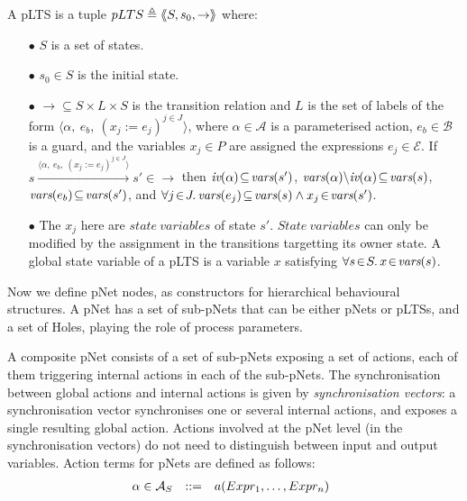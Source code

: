 \documentclass{lncs/llncs}
\def\AlgE{\mathcal{E}}
\def\AlgA{\mathcal{A}}
\def\AlgAS{\mathcal{A}_S}
\def\AlgB{\mathcal{B}}
\begin{document}
\begin{definition}[pLTS]
\label{pLTS}
A pLTS is a tuple
$pLTS\triangleq\langle\hspace{-0.58ex}\langle S,s_0, \to\rangle\hspace{-0.58ex}\rangle$ where:
\begin{itemize}
\item[$\bullet$]
$S$ is a set of states.
\item[$\bullet$]
$s_0 \in S$ is the initial state.
\item[$\bullet$] $\to \subseteq S \times L \times S$ is the transition relation and 
$L$ is the set of labels of the form
$\langle \alpha,~e_b,~(x_j\!:= {e}_j)^{j\in J}\rangle$,
where $\alpha \in\AlgA$ is a parameterised action, $e_b \in
\AlgB$ is a guard, and the variables $x_j\in P$
are assigned the expressions $e_j\in \AlgE$.
If 
$s \xrightarrow{\langle \alpha,~e_b,~(x_j\!:= {e}_j)^{j\in
		J}\rangle} s'\in \to $ then $\iv(\alpha)\!\subseteq\! \vars(s')$, 
		$\vars(\alpha)\backslash \iv(\alpha)\!\subseteq\! \vars(s)$, 
		$\vars(e_b)\!\subseteq\! \vars(s')$, and
		$\forall j\!\in\! J .\,\vars(e_j)\!\subseteq\! \vars(s)\land 
		x_j\!\in\!\vars(s')$. %
\item[$\bullet$]
The $x_j$ here are $state\ variables$ of state $s'$. $State\ variables$ can only be modified by the assignment in the transitions targetting its owner state. A global state variable of a pLTS is a variable $x$ satisfying $\forall s\!\in\! S .\, x\!\in\! \vars(s)$.


\end{itemize}
\end{definition}

Now we define
pNet nodes, as constructors for hierarchical behavioural structures.
A pNet has a set of sub-pNets that can be either pNets or pLTSs, and a
set of Holes, playing the role of process parameters.

A composite pNet consists of a set of sub-pNets exposing
a set of actions, each of them triggering internal actions in each of
the sub-pNets. The synchronisation between global actions and
internal actions is given by  \emph{synchronisation vectors}: a
synchronisation vector synchronises one or several internal actions, and
exposes a single resulting global action.
Actions involved at the pNet level (in the synchronisation vectors) do
not need to distinguish between input and output
variables. Action terms for pNets are defined as follows:
\[\begin{array}[l]{rcl@{\quad}l}
  \alpha\in \AlgAS &::=&a(Expr_1,\ldots,Expr_n)
\end{array}
\]
\end{document}
